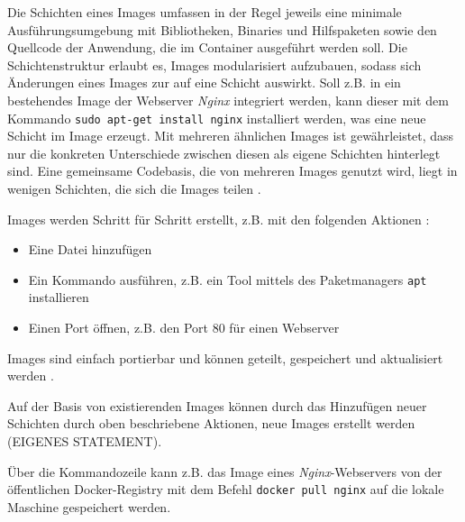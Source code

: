 \documentclass[../main.tex]{subfiles}
\begin{document}
      Die Schichten eines Images umfassen in der Regel jeweils eine minimale Ausführungsumgebung mit Bibliotheken, Binaries und Hilfspaketen sowie den Quellcode der Anwendung, die im Container ausgeführt werden soll. Die Schichtenstruktur erlaubt es, Images modularisiert aufzubauen, sodass sich Änderungen eines Images zur auf eine Schicht auswirkt. Soll z.B. in ein bestehendes Image der Webserver \emph{Nginx} integriert werden, kann dieser mit dem Kommando \texttt{sudo apt-get install nginx} installiert werden, was eine neue Schicht im Image erzeugt. Mit mehreren ähnlichen Images ist gewährleistet, dass nur die konkreten Unterschiede zwischen diesen als eigene Schichten hinterlegt sind. Eine gemeinsame Codebasis, die von mehreren Images genutzt wird, liegt in wenigen Schichten, die sich die Images teilen \cite[S.3]{dockerIntroIEEE}.







      Images werden Schritt für Schritt erstellt, z.B. mit den folgenden Aktionen \cite[S.11]{dockerBook}:

      \begin{itemize}
        \item Eine Datei hinzufügen
        \item Ein Kommando ausführen, z.B. ein Tool mittels des Paketmanagers \texttt{apt} installieren
        \item Einen Port öffnen, z.B. den Port 80 für einen Webserver
      \end{itemize}

      Images sind einfach portierbar und können geteilt, gespeichert und aktualisiert werden \cite[S.11]{dockerBook}.

      Auf der Basis von existierenden Images können durch das Hinzufügen neuer Schichten durch oben beschriebene Aktionen, neue Images erstellt werden (EIGENES STATEMENT).

      Über die Kommandozeile kann z.B. das Image eines \emph{Nginx}-Webservers von der öffentlichen Docker-Registry mit dem Befehl \texttt{docker pull nginx} auf die lokale Maschine gespeichert werden.
\end{document}
